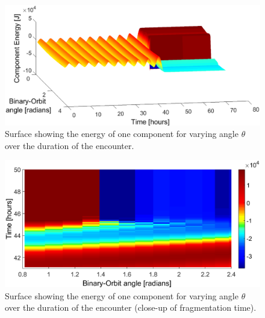\documentclass[letterpaper, preprint, paper,11pt]{AAS}	%
\begin{document}
 \begin{figure}[H]
\centering
\centerline{\includegraphics[width=1.0\textwidth]{phasing_energy_full.eps}} 
\caption{Surface showing the energy of one component for varying angle $\theta$ over the duration of the encounter.} 
\label{fig:phase}
\end{figure} 
 \begin{figure}[H]
\centering
\centerline{\includegraphics[width=\textwidth]{phasing_energy_zoom.eps}} 
\caption{Surface showing the energy of one component for varying angle $\theta$ over the duration of the encounter (close-up of fragmentation time).} 
\label{fig:phase_zoom}
\end{figure} 
\end{document}
